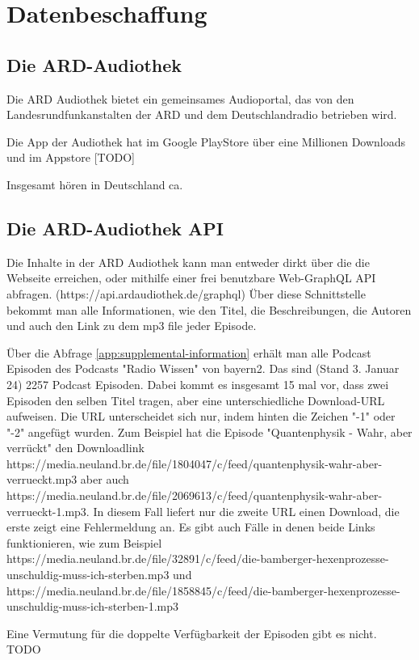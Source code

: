\chapter{Datenbeschaffung}\label{ch:data}

\section{Die ARD-Audiothek}

Die ARD Audiothek bietet ein gemeinsames Audioportal, das von den Landesrundfunkanstalten der ARD und dem Deutschlandradio betrieben wird.

Die App der Audiothek hat im Google PlayStore über eine Millionen Downloads und im Appstore [TODO]

Insgesamt hören in Deutschland ca. 

\section{Die ARD-Audiothek API}

Die Inhalte in der ARD Audiothek kann man entweder dirkt über die die Webseite erreichen, oder mithilfe einer frei benutzbare Web-GraphQL API abfragen.
(https://api.ardaudiothek.de/graphql) 
Über diese Schnittstelle bekommt man alle Informationen, wie den Titel, die Beschreibungen, die Autoren und auch den Link zu dem mp3 file jeder Episode.

Über die Abfrage \autoref{app:supplemental-information} erhält man alle Podcast Episoden des Podcasts "Radio Wissen" von bayern2.
Das sind (Stand 3. Januar 24) 2257 Podcast Episoden.
Dabei kommt es insgesamt 15 mal vor, dass zwei Episoden den selben Titel tragen, aber eine unterschiedliche Download-URL aufweisen.
Die URL unterscheidet sich nur, indem hinten die Zeichen "-1" oder "-2" angefügt wurden.
Zum Beispiel hat die Episode "Quantenphysik - Wahr, aber verrückt" den Downloadlink https://media.neuland.br.de/file/1804047/c/feed/quantenphysik-wahr-aber-verrueckt.mp3 aber auch https://media.neuland.br.de/file/2069613/c/feed/quantenphysik-wahr-aber-verrueckt-1.mp3.
In diesem Fall liefert nur die zweite URL einen Download, die erste zeigt eine Fehlermeldung an.
Es gibt auch Fälle in denen beide Links funktionieren, wie zum Beispiel 
https://media.neuland.br.de/file/32891/c/feed/die-bamberger-hexenprozesse-unschuldig-muss-ich-sterben.mp3 und
https://media.neuland.br.de/file/1858845/c/feed/die-bamberger-hexenprozesse-unschuldig-muss-ich-sterben-1.mp3   

Eine Vermutung für die doppelte Verfügbarkeit der Episoden gibt es nicht. TODO

